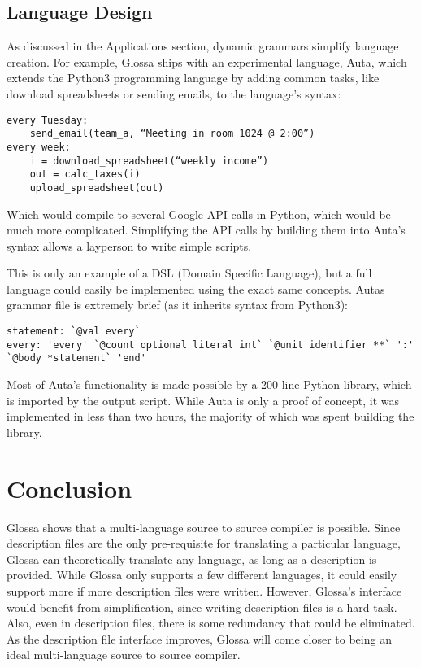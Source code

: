 \documentclass{article}
\begin{document}
\subsection{Language Design}

As discussed in the Applications section, dynamic grammars simplify language creation.
For example, Glossa ships with an experimental language, Auta, which extends the Python3 programming language by adding common tasks, like download spreadsheets or sending emails, to the language's syntax:

\lstset{language=Python}
\begin{lstlisting}
every Tuesday:
    send_email(team_a, “Meeting in room 1024 @ 2:00”)
every week:
    i = download_spreadsheet(“weekly income”)
    out = calc_taxes(i)
    upload_spreadsheet(out)
\end{lstlisting}
Which would compile to several Google-API calls in Python, which would be much more complicated. 
Simplifying the API calls by building them into Auta's syntax allows a layperson to write simple scripts.

This is only an example of a DSL (Domain Specific Language), but a full language could easily be implemented using the exact same concepts.
Autas grammar file is extremely brief (as it inherits syntax from Python3):

\begin{verbatim}
statement: `@val every`
every: 'every' `@count optional literal int` `@unit identifier **` ':' `@body *statement` 'end'
\end{verbatim}

Most of Auta's functionality is made possible by a 200 line Python library, which is imported by the output script.
While Auta is only a proof of concept, it was implemented in less than two hours, the majority of which was spent building the library.

\section{Conclusion}

Glossa shows that a multi-language source to source compiler is possible. 
Since description files are the only pre-requisite for translating a particular language, Glossa can theoretically translate any language, as long as a description is provided.
While Glossa only supports a few different languages, it could easily support more if more description files were written.
However, Glossa's interface would benefit from simplification, since writing description files is a hard task. 
Also, even in description files, there is some redundancy that could be eliminated.
As the description file interface improves, Glossa will come closer to being an ideal multi-language source to source compiler.
\end{document}
